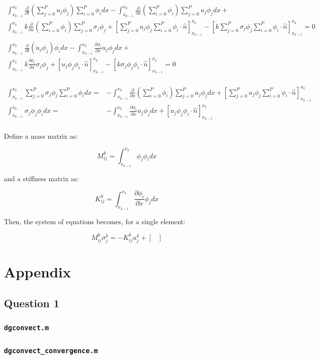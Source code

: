 \documentclass[10pt]{article}
\newcommand{\beq}{\begin{equation}}
\newcommand{\eeq}{\end{equation}}
\newcommand{\beqa}{\begin{equation}\begin{aligned}}
\newcommand{\eeqa}{\end{aligned}\end{equation}}
\begin{document}
\beqa
\int_{x_{k-1}}^{x_k}\frac{\partial}{\partial t}\left(\sum_{j=0}^{P}u_j\phi_j\right)\sum_{i=0}^{P}\phi_idx-\int_{x_{k-1}}^{x_k}\frac{\partial}{\partial x}\left(\sum_{i=0}^{P}\phi_i\right)\sum_{j=0}^{P}u_j\phi_jdx+\quad\\
\int_{x_{k-1}}^{x_k}k\frac{\partial}{\partial x}\left(\sum_{i=0}^{P}\phi_i\right)\sum_{j=0}^{P}\sigma_j\phi_j+\left\lbrack \sum_{j=0}^{P}u_j\phi_j\sum_{i=0}^{P}\phi_i\cdot\hat{n}\right\rbrack_{x_{k-1}}^{x_k}-\left\lbrack k\sum_{j=0}^{P}\sigma_j\phi_j\sum_{i=0}^{P}\phi_i\cdot\hat{n}\right\rbrack_{x_{k-1}}^{x_k}=0\\
\\
\int_{x_{k-1}}^{x_k}\frac{\partial}{\partial t}\left(u_j\phi_j\right)\phi_idx-\int_{x_{k-1}}^{x_k}\frac{\partial\phi_i}{\partial x}u_j\phi_jdx+\quad\\
\int_{x_{k-1}}^{x_k}k\frac{\partial\phi_i}{\partial x}\sigma_j\phi_j+\left\lbrack u_j\phi_j\phi_i\cdot\hat{n}\right\rbrack_{x_{k-1}}^{x_k}-\left\lbrack k\sigma_j\phi_j\phi_i\cdot\hat{n}\right\rbrack_{x_{k-1}}^{x_k}=0\\
\eeqa

\beqa
\int_{x_{k-1}}^{x_k}\sum_{j=0}^{P}\sigma_j\phi_j\sum_{i=0}^{P}\phi_idx=&-\int_{x_{k-1}}^{x_k}\frac{\partial}{\partial x}\left(\sum_{i=0}^{P}\phi_i\right)\sum_{j=0}^{P}u_j\phi_jdx+\left\lbrack \sum_{j=0}^{P}u_j\phi_j\sum_{i=0}^{P}\phi_i\cdot\hat{n}\right\rbrack_{x_{k-1}}^{x_k}\\
\int_{x_{k-1}}^{x_k}\sigma_j\phi_j\phi_idx=&-\int_{x_{k-1}}^{x_k}\frac{\partial\phi_i}{\partial x}u_j\phi_jdx+\left\lbrack u_j\phi_j\phi_i\cdot\hat{n}\right\rbrack_{x_{k-1}}^{x_k}\\
\eeqa

Define a mass matrix as:

\beq
M_{ij}^k=\int_{x_{k-1}}^{x_k}\phi_j\phi_idx
\eeq

and a stiffness matrix as:

\beq
K_{ij}^k=\int_{x_{k-1}}^{x_k}\frac{\partial\phi_i}{\partial x}\phi_jdx
\eeq



Then, the system of equations becomes, for a single element:

\beq
M_{ij}^k\sigma_j^k=-K_{ij}^ku_j^k+\begin{bmatrix}\end{bmatrix}
\eeq



\section{Appendix}
\subsection{Question 1}
\subsubsection{{\tt dgconvect.m}}

\subsubsection{{\tt dgconvect\_convergence.m}}

\end{document}
